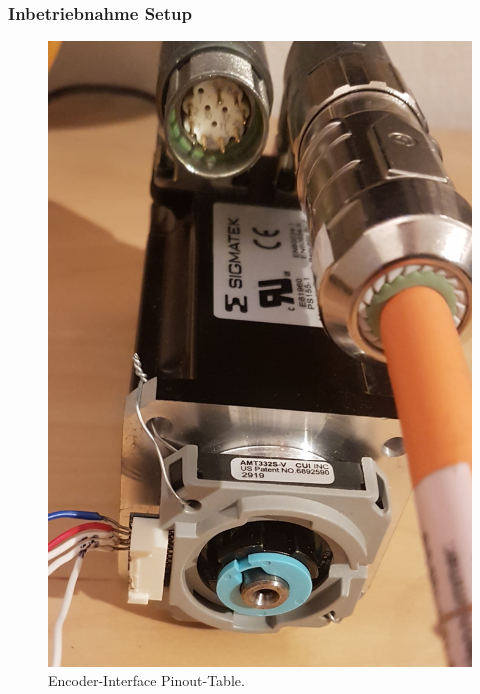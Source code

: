 \subsubsection{Inbetriebnahme Setup}\label{Appendix:ABN_Setup}

\begin{figure}[H]
	\centering
	\includegraphics[angle = 270, width=\textwidth]{graphics/4_Encoder_Motor}
	\caption{Encoder-Interface Pinout-Table.}
	\label{fig:4_Encoder_Motor}
\end{figure}

